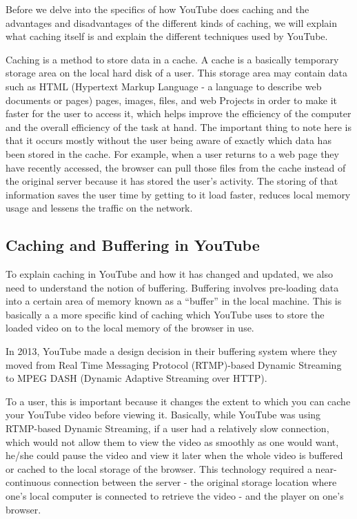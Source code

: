 Before we delve into the specifics of how YouTube does caching and the advantages and disadvantages of the different kinds of caching, we will explain what caching itself is and explain the different techniques used by YouTube. 

Caching is a method to store data in a cache. A cache is a basically temporary storage area on the local hard disk of a user. This storage area may contain data such as HTML (Hypertext Markup Language - a language to describe web documents or pages) pages, images, files, and web Projects in order to make it faster for the user to access it, which helps improve the efficiency of the computer and the overall efficiency of the task at hand. The important thing to note here is that it occurs mostly without the user being aware of exactly which data has been stored in the cache. For example, when a user returns to a web page they have recently accessed, the browser can pull those files from the cache instead of the original server because it has stored the user's activity. The storing of that information saves the user time by getting to it load faster, reduces local memory usage and lessens the traffic on the network. 


\subsection{Caching and Buffering in YouTube}
To explain caching in YouTube and how it has changed and updated, we also need to understand the notion of buffering. Buffering involves pre-loading data into a certain area of memory known as a ``buffer'' in the local machine. This is basically a a more specific kind of caching which YouTube uses to store the loaded video on to the local memory of the browser in use.

In 2013, YouTube made a design decision in their buffering system where they moved from Real Time Messaging Protocol (RTMP)-based Dynamic Streaming to MPEG DASH (Dynamic Adaptive Streaming over HTTP).

To a user, this is important because it changes the extent to which you can cache your YouTube video before viewing it. Basically, while YouTube was using RTMP-based Dynamic Streaming, if a user had a relatively slow connection, which would not allow them to view the video as smoothly as one would want, he/she could pause the video and view it later when the whole video is buffered or cached to the local storage of the browser. This technology required a near-continuous connection between the server - the original storage location where one's local computer is connected to retrieve the video - and the player on one's browser.

